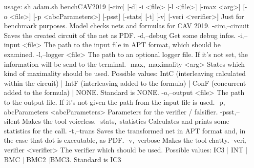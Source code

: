 usage: sh adam.sh benchCAV2019 [-circ] [-d] -i <file> [-l <file>] [-max <arg>] [-o <file>] [-p
       <abcParameters>] [-psst] [-stats] [-t] [-v] [-veri <verifier>]
Just for benchmark purposes. Model checks nets and formulas for CAV 2019.
 -circ,--circuit                      Saves the created circuit of the net as PDF.
 -d,--debug                           Get some debug infos.
 -i,--input <file>                    The path to the input file in APT format, which should
                                      be examined.
 -l,--logger <file>                   The path to an optional logger file. If it's not set,
                                      the information will be send to the terminal.
 -max,--maximality <arg>              States which kind of maximality should be used. Possible
                                      values: IntC (interleaving calculated within the
                                      circuit)  | IntF (interleaving added to the formula)  |
                                      ConF (concurrent added to the formula)  | NONE. Standard
                                      is NONE.
 -o,--output <file>                   The path to the output file. If it's not given the path
                                      from the input file is used.
 -p,--abcParameters <abcParameters>   Parameters for the verifier / falsifier.
 -psst,--silent                       Makes the tool voiceless.
 -stats,--statistics                  Calculates and prints some statistics for the call.
 -t,--trans                           Saves the transformed net in APT format and, in the case
                                      that dot is executable, as PDF.
 -v,--verbose                         Makes the tool chatty.
 -veri,--verifier <verifier>          The verifier which should be used. Possible values: IC3
                                      | INT | BMC | BMC2 |BMC3. Standard is IC3
